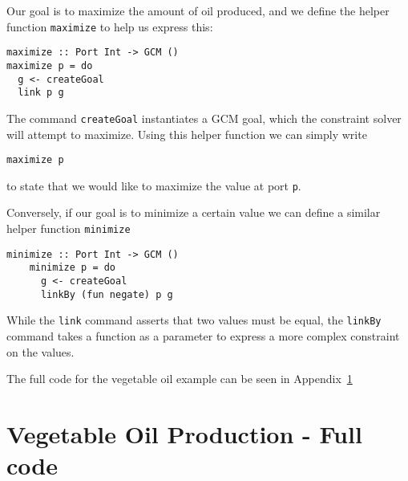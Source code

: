 \documentclass[a4paper]{article}
\begin{document}
Our goal is to maximize the amount of oil produced, and we define the helper
function \texttt{maximize} to help us express this:
\begin{verbatim}
maximize :: Port Int -> GCM ()
maximize p = do
  g <- createGoal
  link p g
\end{verbatim}

The command \texttt{createGoal} instantiates a GCM goal, which the constraint
solver will attempt to maximize. Using this helper function we can simply write
\begin{verbatim}
maximize p
\end{verbatim}
to state that we would like to maximize the value at port \texttt{p}.

Conversely, if our goal is to minimize a certain value we can define a similar
helper function \texttt{minimize}
\begin{verbatim}
minimize :: Port Int -> GCM ()
	minimize p = do
	  g <- createGoal
	  linkBy (fun negate) p g
\end{verbatim}

While the \texttt{link} command asserts that two values must be equal, the
\texttt{linkBy} command takes a function as a parameter to express a more
complex constraint on the values.

The full code for the vegetable oil example can be seen in Appendix~\ref{oilcode}
\appendix
\section{Vegetable Oil Production - Full code}\label{oilcode}
\inputminted[linenos]{haskell}{examples/OilCrops.hs}
\end{document}
